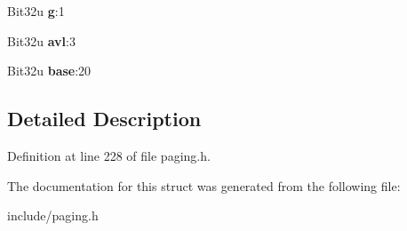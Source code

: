 \begin{DoxyCompactItemize}
\item 
\hypertarget{structX86__PageEntryBlock_a282678ef5c0a3146c4f1dede36b39184}{Bit32u {\bfseries g}\-:1}\label{structX86__PageEntryBlock_a282678ef5c0a3146c4f1dede36b39184}

\item 
\hypertarget{structX86__PageEntryBlock_a3a3c575ff0e58b07ea6184eb35bb214d}{Bit32u {\bfseries avl}\-:3}\label{structX86__PageEntryBlock_a3a3c575ff0e58b07ea6184eb35bb214d}

\item 
\hypertarget{structX86__PageEntryBlock_ae2b92de4c563ce709fee89077e9fc262}{Bit32u {\bfseries base}\-:20}\label{structX86__PageEntryBlock_ae2b92de4c563ce709fee89077e9fc262}

\end{DoxyCompactItemize}


\subsection{Detailed Description}


Definition at line 228 of file paging.\-h.



The documentation for this struct was generated from the following file\-:\begin{DoxyCompactItemize}
\item 
include/paging.\-h\end{DoxyCompactItemize}
